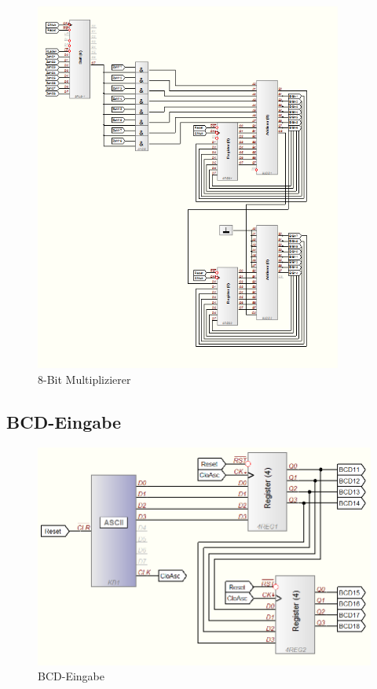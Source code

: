 \documentclass[a4paper,12pt,fleqn,oneside]{article}
\begin{document}
		\begin{figure}[h]
			\center
			\includegraphics[width=0.9\textwidth]{multiplizierer}
			\caption{8-Bit Multiplizierer}
			\label{fig:Multiplizierer}
		\end{figure}
		\FloatBarrier


\newpage
	\subsection{BCD-Eingabe}
		\begin{figure}[h]
			\center
			\includegraphics[width=1.0\textwidth]{bcd_eingabe}
			\caption{BCD-Eingabe}
			\label{fig:bcd_eingabe}
		\end{figure}
		\FloatBarrier
		
\end{document}
